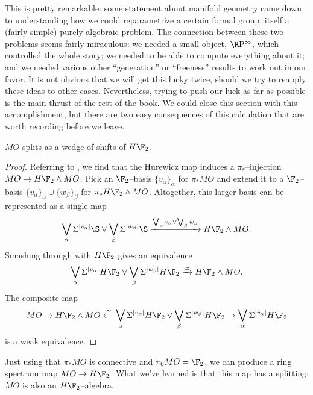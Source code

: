 This is pretty remarkable: some statement about manifold geometry came down to understanding how we could reparametrize a certain formal group, itself a (fairly simple) purely algebraic problem.  The connection between these two problems seems fairly miraculous: we needed a small object, $\RP^\infty$, which controlled the whole story; we needed to be able to compute everything about it; and we needed various other ``generation'' or ``freeness'' results to work out in our favor.  It is not obvious that we will get this lucky twice, should we try to reapply these ideas to other cases.  Nevertheless, trying to push our luck as far as possible is the main thrust of the rest of the book.  We could close this section with this accomplishment, but there are two easy consequences of this calculation that are worth recording before we leave.

\begin{lemma}
$MO$ splits as a wedge of shifts of $H\F_2$.
\end{lemma}
\begin{proof}
Referring to , we find that the Hurewicz map induces a $\pi_*$--injection $MO \to H\F_2 \sm MO$.  Pick an $\F_2$--basis $\{v_\alpha\}_\alpha$ for $\pi_* MO$ and extend it to a $\F_2$--basis $\{v_\alpha\}_\alpha \cup \{w_\beta\}_\beta$ for $\pi_* H\F_2 \sm MO$.  Altogether, this larger basis can be represented as a single map \[\bigvee_\alpha \Susp^{|v_\alpha|} \S \vee \bigvee_\beta \Susp^{|w_\beta|} \S \xrightarrow{\bigvee_\alpha v_\alpha \vee \bigvee_\beta w_\beta} H\F_2 \sm MO.\]  Smashing through with $H\F_2$ gives an equivalence \[\bigvee_\alpha \Susp^{|v_\alpha|} H\F_2 \vee \bigvee_\beta \Susp^{|w_\beta|} H\F_2 \xrightarrow\simeq H\F_2 \sm MO.\]  The composite map \[MO \to H\F_2 \sm MO \xleftarrow\simeq \bigvee_\alpha \Susp^{|v_\alpha|} H\F_2 \vee \bigvee_\beta \Susp^{|w_\beta|} H\F_2 \to \bigvee_\alpha \Susp^{|v_\alpha|} H\F_2\] is a weak equivalence.
\end{proof}

\begin{remark}
Just using that $\pi_* MO$ is connective and $\pi_0 MO = \F_2$, we can produce a ring spectrum map $MO \to H\F_2$.  What we've learned is that this map has a splitting: $MO$ is also an $H\F_2$--algebra.
\end{remark}

\newpage

\begin{remark}
\end{remark}


